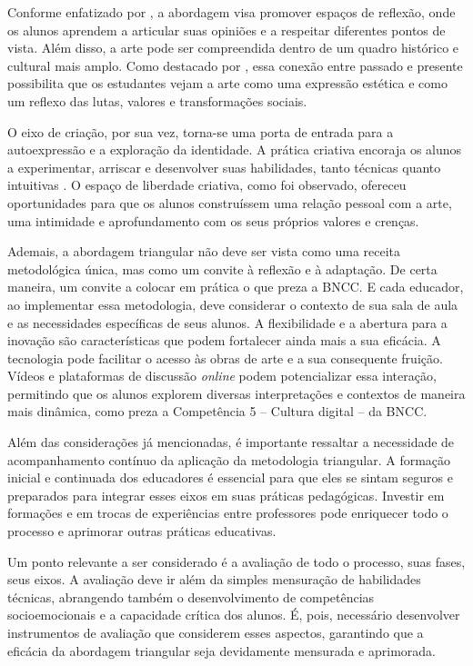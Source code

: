 \documentclass[portuguese]{textolivre}
\begin{document}
Conforme enfatizado por \textcite{barbosa2018debate}, a abordagem visa promover espaços de reflexão, onde os alunos aprendem a articular suas opiniões e a respeitar diferentes pontos de vista. Além disso, a arte pode ser compreendida dentro de um quadro histórico e cultural mais amplo. Como destacado por \textcite{lopes2013metodologias}, essa conexão entre passado e presente possibilita que os estudantes vejam a arte como uma expressão estética e como um reflexo das lutas, valores e transformações sociais.

O eixo de criação, por sua vez, torna-se uma porta de entrada para a autoexpressão e a exploração da identidade. A prática criativa encoraja os alunos a experimentar, arriscar e desenvolver suas habilidades, tanto técnicas quanto intuitivas \cite{minayo2010pesquisa}. O espaço de liberdade criativa, como foi observado, ofereceu oportunidades para que os alunos construíssem uma relação pessoal com a arte, uma intimidade e aprofundamento com os seus próprios valores e crenças.

Ademais, a abordagem triangular não deve ser vista como uma receita metodológica única, mas como um convite à reflexão e à adaptação. De certa maneira, um convite a colocar em prática o que preza a BNCC. E cada educador, ao implementar essa metodologia, deve considerar o contexto de sua sala de aula e as necessidades específicas de seus alunos. A flexibilidade e a abertura para a inovação são características que podem fortalecer ainda mais a sua eficácia. A tecnologia pode facilitar o acesso às obras de arte e a sua consequente fruição. Vídeos e plataformas de discussão \textit{online} podem potencializar essa interação, permitindo que os alunos explorem diversas interpretações e contextos de maneira mais dinâmica, como preza a Competência 5 – Cultura digital – da BNCC.

Além das considerações já mencionadas, é importante ressaltar a necessidade de acompanhamento contínuo da aplicação da metodologia triangular. A formação inicial e continuada dos educadores é essencial para que eles se sintam seguros e preparados para integrar esses eixos em suas práticas pedagógicas. Investir em formações e em trocas de experiências entre professores pode enriquecer todo o processo e aprimorar outras práticas educativas.

Um ponto relevante a ser considerado é a avaliação de todo o processo, suas fases, seus eixos. A avaliação deve ir além da simples mensuração de habilidades técnicas, abrangendo também o desenvolvimento de competências socioemocionais e a capacidade crítica dos alunos. É, pois, necessário desenvolver instrumentos de avaliação que considerem esses aspectos, garantindo que a eficácia da abordagem triangular seja devidamente mensurada e aprimorada.
\end{document}
